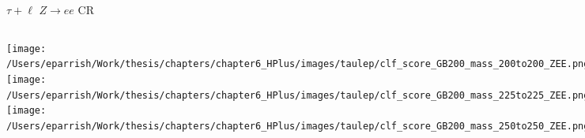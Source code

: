 \documentclass[aspectratio=169,xcolor=table]{beamer}
\begin{document}
    \begin{frame}[t]{$\tau+\ell$ $Z \rightarrow ee$ CR}
      \begin{columns}[t]
          \texttt{[image: /Users/eparrish/Work/thesis/chapters/chapter6\_HPlus/images/taulep/clf\_score\_GB200\_mass\_200to200\_ZEE.png]}
          \texttt{[image: /Users/eparrish/Work/thesis/chapters/chapter6\_HPlus/images/taulep/clf\_score\_GB200\_mass\_225to225\_ZEE.png]}
          \texttt{[image: /Users/eparrish/Work/thesis/chapters/chapter6\_HPlus/images/taulep/clf\_score\_GB200\_mass\_250to250\_ZEE.png]}

          \texttt{[image: /Users/eparrish/Work/thesis/chapters/chapter6\_HPlus/images/taulep/clf\_score\_GB200\_mass\_275to275\_ZEE.png]}
          \texttt{[image: /Users/eparrish/Work/thesis/chapters/chapter6\_HPlus/images/taulep/clf\_score\_GB200\_mass\_300to300\_ZEE.png]}
          \texttt{[image: /Users/eparrish/Work/thesis/chapters/chapter6\_HPlus/images/taulep/clf\_score\_GB200\_mass\_350to350\_ZEE.png]}

          \texttt{[image: /Users/eparrish/Work/thesis/chapters/chapter6\_HPlus/images/taulep/clf\_score\_GB200\_mass\_400to400\_ZEE.png]}
          \texttt{[image: /Users/eparrish/Work/thesis/chapters/chapter6\_HPlus/images/taulep/clf\_score\_GB200\_mass\_500to500\_ZEE.png]}
          \texttt{[image: /Users/eparrish/Work/thesis/chapters/chapter6\_HPlus/images/taulep/clf\_score\_GB200\_mass\_600to600\_ZEE.png]}

          \texttt{[image: /Users/eparrish/Work/thesis/chapters/chapter6\_HPlus/images/taulep/clf\_score\_GB200\_mass\_700to700\_ZEE.png]}
          \texttt{[image: /Users/eparrish/Work/thesis/chapters/chapter6\_HPlus/images/taulep/clf\_score\_GB200\_mass\_800to800\_ZEE.png]}
          \texttt{[image: /Users/eparrish/Work/thesis/chapters/chapter6\_HPlus/images/taulep/clf\_score\_GB200\_mass\_900to900\_ZEE.png]}

      \end{columns}
    \end{frame}
\end{document}
